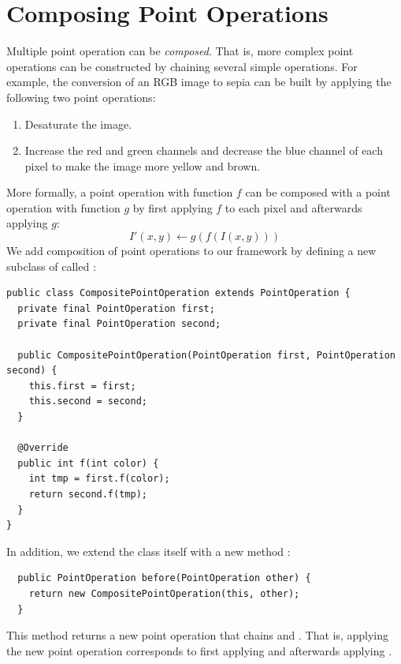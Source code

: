 \documentclass{book}
\begin{document}
\section{Composing Point Operations}
Multiple point operation can be \emph{composed}. That is, more complex point operations can be constructed by chaining several simple operations. For example, the conversion of an RGB image to sepia can be built by applying the following two point operations:
\begin{enumerate}
  \item Desaturate the image.
  \item Increase the red and green channels and decrease the blue channel of each pixel to make the image more yellow and brown.
\end{enumerate}
More formally, a point operation with function $f$ can be composed with a point operation with function $g$ by first applying $f$ to each pixel and afterwards applying $g$: 
$$I'(x, y) \leftarrow g(f(I(x, y)))$$
We add composition of point operations to our framework by defining a new subclass of  called :
\begin{lstlisting}
public class CompositePointOperation extends PointOperation {
  private final PointOperation first;
  private final PointOperation second;
  
  public CompositePointOperation(PointOperation first, PointOperation second) {
    this.first = first;
    this.second = second;  
  }
  
  @Override
  public int f(int color) {
    int tmp = first.f(color);
    return second.f(tmp);  
  }
}
\end{lstlisting}
In addition, we extend the class  itself with a new method :
\begin{lstlisting}
  public PointOperation before(PointOperation other) {
    return new CompositePointOperation(this, other);
  }
\end{lstlisting}
This method returns a new point operation that chains  and . That is, applying the new point operation corresponds to first applying  and afterwards applying .
\end{document}
